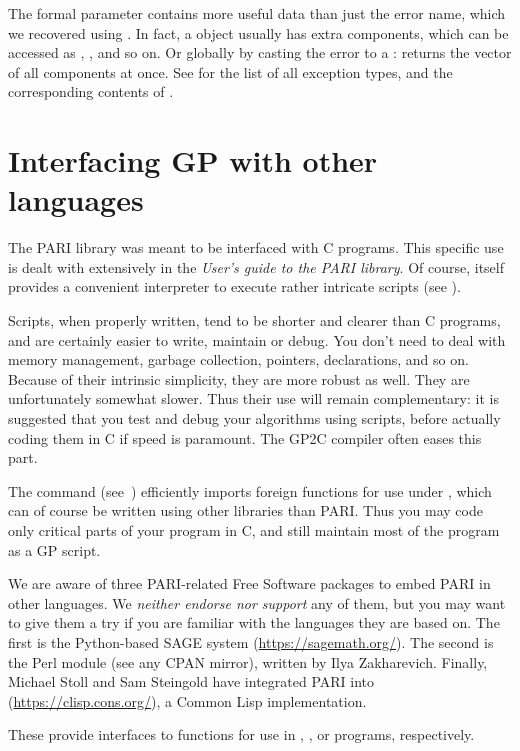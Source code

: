 The  formal parameter contains more useful data than just the error
name, which we recovered using . In fact, a 
object usually has extra components, which can be accessed as
, , and so on. Or globally by
casting the error to a :  returns the vector
of all components at once. See  for the list of all
exception types, and the corresponding contents of .

\section{Interfacing GP with other languages}
\noindent
The PARI library was meant to be interfaced with C programs. This specific
use is dealt with extensively in the \emph{User's guide to the PARI library}.
Of course,  itself provides a convenient  interpreter to execute
rather intricate scripts (see ).

Scripts, when properly written, tend to be shorter and clearer than C
programs, and are certainly easier to write, maintain or debug. You don't
need to deal with memory management, garbage collection, pointers,
declarations, and so on. Because of their intrinsic simplicity, they are more
robust as well. They are unfortunately somewhat slower. Thus their use will
remain complementary: it is suggested that you test and debug your algorithms
using scripts, before actually coding them in C if speed is paramount.
The GP2C compiler often eases this part.

The  command (see~) efficiently imports
foreign functions for use under , which can of course be written
using other libraries than PARI. Thus you may code only critical parts
of your program in C, and still maintain most of the program as a GP script.

We are aware of three PARI-related Free Software packages to embed PARI in
other languages. We \emph{neither endorse nor support} any of them, but you
may want to give them a try if you are familiar with the languages they are
based on. The first is the Python-based SAGE
system (\url{https://sagemath.org/}). The second is the  Perl
module (see any CPAN mirror), written by Ilya Zakharevich.
Finally, Michael Stoll and Sam Steingold have integrated PARI into 
(\url{https://clisp.cons.org/}), a Common Lisp implementation.

These provide interfaces to  functions for use in
, , or 
programs, respectively.

